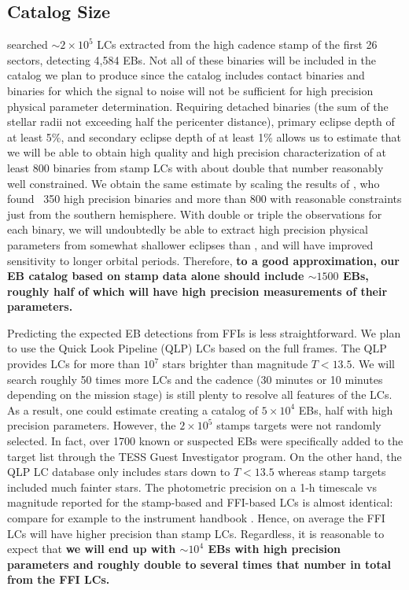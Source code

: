 %
\label{sec:expected_outcomes}

\subsection{Catalog Size}
%
\label{sec:catalog_size}

\citep{Prsa_et_al_22} searched $\sim2\times10^5$ LCs extracted from the high
cadence stamp of the first 26 \tess{} sectors, detecting 4,584 EBs. Not all of
these binaries will be included in the catalog we plan to produce since the
\citep{Prsa_et_al_22} catalog includes contact binaries and binaries for which
the signal to noise will not be sufficient for high precision physical parameter
determination.  Requiring detached binaries (the sum of the stellar radii not
exceeding half the pericenter distance), primary eclipse depth of at least 5\%,
and secondary eclipse depth of at least 1\% allows us to estimate that we will
be able to obtain high quality and high precision characterization of at least
800 binaries from stamp LCs with about double that number reasonably well
constrained. We obtain the same estimate by scaling the results of
\citep{Justesen_Albrecht_21}, who found ~350 high precision binaries and more
than 800 with reasonable constraints just from the southern hemisphere. With
double or triple the observations for each binary, we will undoubtedly be able
to extract high precision physical parameters from somewhat shallower eclipses
than \citep{Justesen_Albrecht_21}, and will have improved sensitivity to longer
orbital periods. Therefore, \textbf{to a good approximation, our EB catalog
based on stamp data alone should include $\sim1500$ EBs, roughly half of which
will have high precision measurements of their parameters.}

Predicting the expected EB detections from FFIs is less straightforward. We plan
to use the Quick Look Pipeline (QLP) LCs \citep{Huang_et_al_20a} based on the
full frames. The QLP provides LCs for more than $10^7$ stars brighter than
\tess{} magnitude $T<13.5$. We will search roughly 50 times more LCs and the
cadence (30 minutes or 10 minutes depending on the mission stage) is still
plenty to resolve all features of the LCs. As a result, one could estimate
creating a catalog of $5\times10^4$ EBs, half with high precision parameters.
However, the $2\times10^5$ stamps targets were not randomly selected. In fact,
over 1700 known or suspected EBs were specifically added to the target list
through the TESS Guest Investigator program. On the other hand, the QLP LC
database only includes stars down to $T<13.5$ whereas stamp targets included
much fainter stars. The photometric precision on a 1-h timescale vs magnitude
reported for the stamp-based and FFI-based LCs is almost identical: compare for
example \citep{Kunimoto_et_al_22} to the \tess{} instrument handbook
\citep{TESS_handbook}. Hence, on average the FFI LCs will have higher precision
than stamp LCs. Regardless, it is reasonable to expect that \textbf{we will end
    up with $\sim10^4$ EBs with high precision parameters and roughly double to
several times that number in total from the FFI LCs.}

